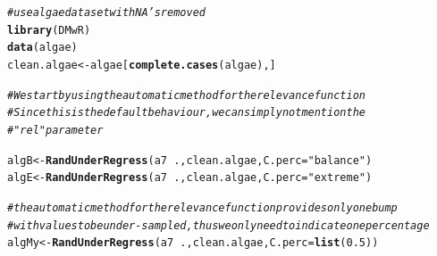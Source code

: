 \documentclass[10pt,a4paper]{article}\usepackage[]{graphicx}\usepackage[]{color}
\makeatletter
\newcommand{\hlnum}[1]{\textcolor[rgb]{0.686,0.059,0.569}{#1}}%
\newcommand{\hlstr}[1]{\textcolor[rgb]{0.192,0.494,0.8}{#1}}%
\newcommand{\hlcom}[1]{\textcolor[rgb]{0.678,0.584,0.686}{\textit{#1}}}%
\newcommand{\hlopt}[1]{\textcolor[rgb]{0,0,0}{#1}}%
\newcommand{\hlstd}[1]{\textcolor[rgb]{0.345,0.345,0.345}{#1}}%
\newcommand{\hlkwb}[1]{\textcolor[rgb]{0.69,0.353,0.396}{#1}}%
\newcommand{\hlkwc}[1]{\textcolor[rgb]{0.333,0.667,0.333}{#1}}%
\newcommand{\hlkwd}[1]{\textcolor[rgb]{0.737,0.353,0.396}{\textbf{#1}}}%
\newenvironment{kframe}{%
 \def\at@end@of@kframe{}%
 \ifinner\ifhmode%
  \def\at@end@of@kframe{\end{minipage}}%
  \begin{minipage}{\columnwidth}%
 \fi\fi%
 \def\FrameCommand##1{\hskip\@totalleftmargin \hskip-\fboxsep
 \colorbox{shadecolor}{##1}\hskip-\fboxsep
     \hskip-\linewidth \hskip-\@totalleftmargin \hskip\columnwidth}%
 \MakeFramed {\advance\hsize-\width
   \@totalleftmargin\z@ \linewidth\hsize
   \@setminipage}}%
 {\par\unskip\endMakeFramed%
 \at@end@of@kframe}
\newenvironment{knitrout}{}{} %
\makeatother
\begin{document}
\begin{knitrout}\footnotesize
{}\color{fgcolor}\begin{kframe}
\begin{alltt}
\hlcom{# use algae data set with NA's removed}
\hlkwd{library}\hlstd{(DMwR)}
\hlkwd{data}\hlstd{(algae)}
\hlstd{clean.algae} \hlkwb{<-} \hlstd{algae[}\hlkwd{complete.cases}\hlstd{(algae),]}

\hlcom{# We start by using the automatic method for the relevance function}
\hlcom{# Since this is the default behaviour, we can simply not mention the}
\hlcom{# "rel" parameter}

\hlstd{algB} \hlkwb{<-} \hlkwd{RandUnderRegress}\hlstd{(a7}\hlopt{~}\hlstd{., clean.algae,} \hlkwc{C.perc}\hlstd{=}\hlstr{"balance"}\hlstd{)}
\hlstd{algE} \hlkwb{<-} \hlkwd{RandUnderRegress}\hlstd{(a7}\hlopt{~}\hlstd{., clean.algae,} \hlkwc{C.perc}\hlstd{=}\hlstr{"extreme"}\hlstd{)}

\hlcom{# the automatic method for the relevance function provides only one bump }
\hlcom{# with values to be under-sampled, thus we only need to indicate one percentage}
\hlstd{algMy} \hlkwb{<-} \hlkwd{RandUnderRegress}\hlstd{(a7}\hlopt{~}\hlstd{., clean.algae,} \hlkwc{C.perc}\hlstd{=}\hlkwd{list}\hlstd{(}\hlnum{0.5}\hlstd{))}
\end{alltt}
\end{kframe}
\end{knitrout}
\end{document}
